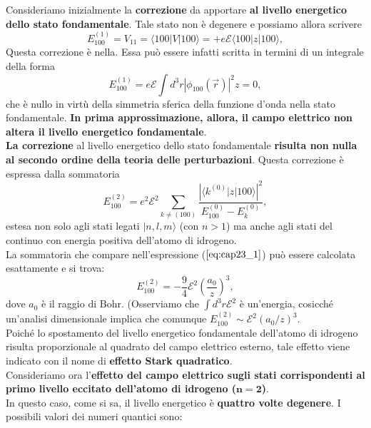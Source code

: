 \documentclass[a4paper,12pt,oneside]{book}
\begin{document}
Consideriamo inizialmente la \textbf{correzione} da apportare \textbf{al livello energetico dello stato fondamentale}. Tale stato non è degenere e possiamo allora scrivere
\begin{equation}
E^{(1)}_{100}=V_{11}=\langle100| V |100\rangle =+e\mathcal{E}\langle 100 | z |100 \rangle,
\end{equation}
Questa correzione è nella. Essa può essere infatti scritta in termini di un integrale della forma
\begin{equation}
E^{(1)}_{100}=e\mathcal{E} \int d^3r \left|\phi_{100}(\vec{r})\right|^2 z=0,
\end{equation}
che è nullo in virtù della simmetria sferica della funzione d'onda nella stato fondamentale. \textbf{In prima approssimazione, allora, il campo elettrico non altera il livello energetico fondamentale}.\\
\textbf{La correzione} al livello energetico dello stato fondamentale \textbf{risulta non nulla al secondo ordine della teoria delle perturbazioni}. Questa correzione è espressa dalla sommatoria
\begin{equation}
\label{eq:cap23_1}
E^{(2)}_{100}=e^2 \mathcal{E}^2 \sum_{k\neq(100)}\frac{\left| \langle k^{(0)} | z |100 \rangle \right|^2}{E^{(0)}_{100}-E^{(0)}_{k}},
\end{equation}
estesa non solo agli stati legati $|n,l,m \rangle$ (con $n>1$) ma anche agli stati del continuo con energia positiva dell'atomo di idrogeno.\\
La sommatoria che compare nell'espressione ($\ref{eq:cap23_1}$) può essere calcolata esattamente e si trova:
\begin{equation}
E^{(2)}_{100}=-\frac{9}{4} \mathcal{E}^2 \left( \frac{a_0}{z} \right)^3,
\end{equation}
dove $a_0$ è il raggio di Bohr. (Osserviamo che $\int d^3r \mathcal{E}^2$ è un'energia, cosicché un'analisi dimensionale implica che comunque $E^{(2)}_{100}\sim\mathcal{E}^2\left( a_0/z \right)^3 $.\\
Poiché lo spostamento del livello energetico fondamentale dell'atomo di idrogeno risulta proporzionale al quadrato del campo elettrico esterno, tale effetto viene indicato con il nome di \textbf{effetto Stark quadratico}.\\
Consideriamo ora l'\textbf{effetto del campo elettrico sugli stati corrispondenti al primo livello eccitato dell'atomo di idrogeno ($\boldsymbol{n=2}$)}.\\
In questo caso, come si sa, il livello energetico è \textbf{quattro volte degenere}. I possibili valori dei numeri quantici sono: \\ \\
\end{document}
